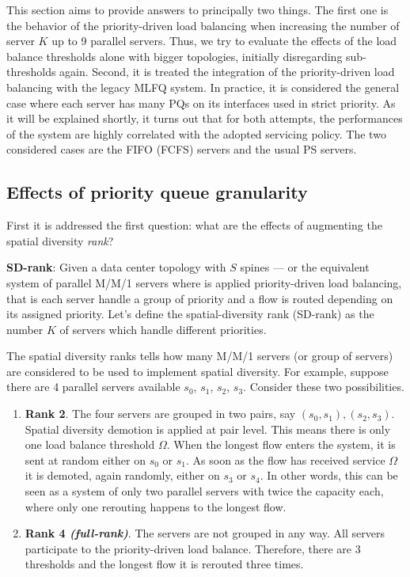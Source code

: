 This section aims to provide answers to principally two things. The first one is the behavior of the priority-driven load balancing when increasing the number of server $K$ up to 9 parallel servers. Thus, we try to evaluate the effects of the load balance thresholds alone with bigger topologies, initially disregarding sub-thresholds again. Second, it is treated the integration of the priority-driven load balancing with the legacy MLFQ system. In practice, it is considered the general case where each server has many PQs on its interfaces used in strict priority. As it will be explained shortly, it turns out that for both attempts, the performances of the system are highly correlated with the adopted servicing policy. The two considered cases are the FIFO (FCFS) servers and the usual PS servers. 

\subsection{Effects of priority queue granularity}
\label{sec:dimensioning-spatial}
First it is addressed the first question: what are the effects of augmenting the spatial diversity \emph{rank}? 
\begin{tcolorbox}[title=Terminology]
	\textbf{SD-rank}: Given a data center topology with $S$ spines --- or the equivalent system of parallel M/M/1 servers where is applied priority-driven load balancing, that is each server handle a group of priority and a flow is routed depending on its assigned priority. Let's define the spatial-diversity rank (SD-rank) as the number $K$ of servers which handle different priorities. 
\end{tcolorbox}
The spatial diversity ranks tells how many M/M/1 servers (or group of servers) are considered to be used to implement spatial diversity. For example, suppose there are 4 parallel servers available $s_0$, $s_1$, $s_2$, $s_3$. Consider these two possibilities. 
\begin{enumerate}
	\item \textbf{Rank 2}. The four servers are grouped in two pairs, say $(s_0, s_1), (s_2,s_3)$. Spatial diversity demotion is applied at pair level. This means there is only one load balance threshold $\Omega$. When the longest flow enters the system, it is sent at random either on $s_0$ or $s_1$. As soon as the flow has received service $\Omega$ it is demoted, again randomly, either on $s_3$ or $s_4$. In other words, this can be seen as a system of only two parallel servers with twice the capacity each, where only one rerouting happens to the longest flow. 
	\item \textbf{Rank 4 \textit{(full-rank)}}. The servers are not grouped in any way. All servers participate to the priority-driven load balance. Therefore, there are 3 thresholds and the longest flow it is rerouted three times.
\end{enumerate}
